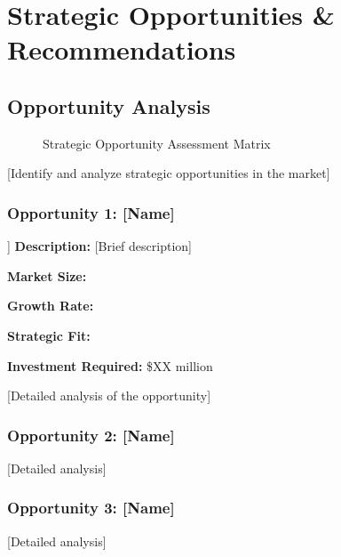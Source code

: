 \documentclass[11pt,letterpaper]{report}
\begin{document}
\chapter{Strategic Opportunities \& Recommendations}

\section{Opportunity Analysis}


\begin{figure}[htbp]
\centering
\caption{Strategic Opportunity Assessment Matrix}
\label{fig:opportunity_matrix}
\end{figure}

[Identify and analyze strategic opportunities in the market]

\subsection{Opportunity 1: [Name]}
\begin{opportunitybox}[Opportunity: [Name]]
\textbf{Description:} [Brief description]

\textbf{Market Size:} 

\textbf{Growth Rate:} 

\textbf{Strategic Fit:} 

\textbf{Investment Required:} \$XX million
\end{opportunitybox}

[Detailed analysis of the opportunity]

\subsection{Opportunity 2: [Name]}
[Detailed analysis]

\subsection{Opportunity 3: [Name]}
[Detailed analysis]
\end{document}
